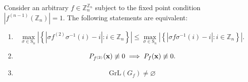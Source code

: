 \begin{prop}\label{prop:composition-lemma-ineq}
Consider an arbitrary $f\in\mathbb{Z}_{n}^{\mathbb{Z}_{n}}$ subject to the fixed point condition
$\left|f^{\left(n-1\right)}\left(\mathbb{Z}_{n}\right)\right|=1$. The following statements are equivalent:
\begin{enumerate}
    \item 
    \[
    \max_{\sigma\in\text{S}_{n}}\left|\left\{ \left|\sigma f^{(2)}\sigma^{-1}(i)-i\right|:i\in\mathbb{Z}_{n}\right\} \right|\le\max_{\sigma\in\text{S}_{n}}\left|\left\{ \left|\sigma f\sigma^{-1}(i)-i\right|:i\in\mathbb{Z}_{n}\right\} \right|.
    \]
    \item
    \[
    P_{f^{(2)}} ({\bf x}) \not\equiv 0  \implies  P_{f} ({\bf x}) \not\equiv 0.
    \]
    \item 
    \[
    \text{GrL}(G_f) \neq \varnothing
    \]
\end{enumerate}    
\end{prop}

